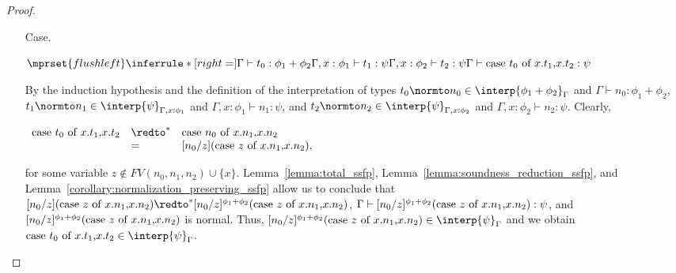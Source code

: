 \begin{proof}
\begin{itemize}
\item[Case.]\ \\
  \begin{center}
    \begin{math}
      $$\mprset{flushleft}
      \inferrule* [right=] {
        \Gamma \vdash t_0:\phi_1 + \phi_2
        \\
	\Gamma,x:\phi_1 \vdash t_1:\psi
        \\
	\Gamma,x:\phi_2 \vdash t_2:\psi
      }{\Gamma \vdash \ccon{t_0}{x}{t_1}{t_2}: \psi}
    \end{math}
  \end{center}
  By the induction hypothesis and the definition of the interpretation of types
  $t_0 \normto n_0 \in \interp{\phi_1 + \phi_2}_\Gamma$ and $\Gamma \vdash n_0:\phi_1+\phi_2$, 
  $t_1 \normto n_1 \in \interp{\psi}_{\Gamma,x:\phi_1}$ and $\Gamma,x:\phi_1 \vdash n_1:\psi$, and
  $t_2 \normto n_2 \in \interp{\psi}_{\Gamma,x:\phi_2}$ and  $\Gamma,x:\phi_2 \vdash n_2:\psi$.  
  Clearly, 
  \begin{center}
    \begin{math}
      \begin{array}{lll}
        \ccon{t_0}{x}{t_1}{t_2} & \redto^* & \ccon{n_0}{x}{n_1}{n_2}\\
                                & =        & [n_0/z](\ccon{z}{x}{n_1}{n_2}),
      \end{array}
    \end{math}
  \end{center}
  for some variable $z \not \in FV(n_0,n_1,n_2) \cup \{x\}$.  Lemma~\ref{lemma:total_ssfp}, 
  Lemma~\ref{lemma:soundness_reduction_ssfp}, and Lemma~\ref{corollary:normalization_preserving_ssfp} 
  allow us to conclude that $[n_0/z](\ccon{z}{x}{n_1}{n_2}) \redto^* [n_0/z]^{\phi_1+\phi_2}(\ccon{z}{x}{n_1}{n_2})$,
  $\Gamma \vdash [n_0/z]^{\phi_1+\phi_2}(\mbox{case}\ z\ \text{of}\ x\text{.}n_1\text{,}x\text{.}n_2) :\psi$, and $[n_0/z]^{\phi_1+\phi_2}(\mbox{case}\ z\ \text{of}\ x\text{.}n_1\text{,}x\text{.}n_2)$
  is normal.  Thus, $[n_0/z]^{\phi_1+\phi_2}(\ccon{z}{x}{n_1}{n_2}) \in \interp{\psi}_\Gamma$ and we obtain 
  $\ccon{t_0}{x}{t_1}{t_2} \in \interp{\psi}_\Gamma$.
  


\end{itemize}
\end{proof}

